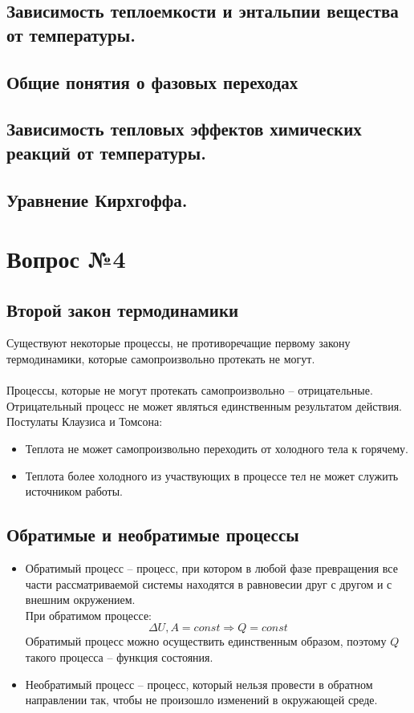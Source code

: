 \documentclass[14pt,a4paper]{scrartcl}
\begin{document}
		\subsection*{Зависимость теплоемкости и энтальпии вещества от температуры.} 
		\subsection*{Общие понятия о фазовых переходах} 		
		\subsection*{Зависимость тепловых эффектов химических реакций от температуры.} 		
		\subsection*{Уравнение Кирхгоффа.} 		

\section*{Вопрос №4}

	\subsection*{Второй закон термодинамики} 
	Существуют некоторые процессы, не противоречащие первому закону термодинамики, которые самопроизвольно протекать не могут.\\ \\
	Процессы, которые не могут протекать самопроизвольно -- отрицательные. Отрицательный процесс не может являться единственным результатом действия. \\
	Постулаты Клаузиса и Томсона:
	\begin{itemize}
		\item Теплота не может самопроизвольно переходить от холодного тела к горячему.
		\item Теплота более холодного из участвующих в процессе тел не может служить источником работы.
	\end{itemize}
	\subsection*{Обратимые и необратимые процессы} 
	\begin{itemize}
		\item Обратимый процесс -- процесс, при котором в любой фазе превращения все части рассматриваемой системы находятся в равновесии друг с другом и с внешним окружением. \\
		При обратимом процессе: 
		$$ \Delta{U}, A = const  \Rightarrow Q = const  $$
		Обратимый процесс можно осуществить единственным образом, поэтому $Q$ такого процесса  -- функция состояния.
		\item Необратимый процесс -- процесс, который нельзя провести в обратном направлении так, чтобы не произошло изменений в окружающей среде.
	\end{itemize}
\end{document}
